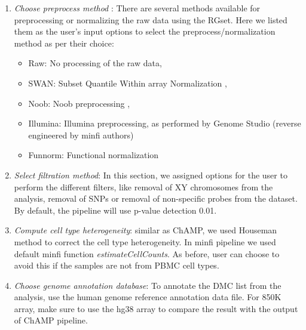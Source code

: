 \documentclass[
  a4paper,
  oneside,
  open=any]{scrreport}
\providecommand{\tightlist}{%
  \setlength{\itemsep}{0pt}\setlength{\parskip}{0pt}}\usepackage{longtable,booktabs,array}
\begin{document}
\begin{enumerate}
\def\labelenumi{\arabic{enumi}.}
\item
  \emph{Choose preprocess method} : There are several methods available
  for preprocessing or normalizing the raw data using the RGset. Here we
  listed them as the user's input options to select the
  preprocess/normalization method as per their choice:

  \begin{itemize}
  \tightlist
  \item
    Raw: No processing of the raw data,
  \item
    SWAN: Subset Quantile Within array Normalization
    \autocite{maksimovic2012swan,touleimat2012complete},
  \item
    Noob: Noob preprocessing \autocite{triche2013low},
  \item
    Illumina: Illumina preprocessing, as performed by Genome Studio
    (reverse engineered by minfi authors) \autocite{aryee2014minfi}
  \item
    Funnorm: Functional normalization \autocite{fortin2014functional}
  \end{itemize}
\item
  \emph{Select filtration method}: In this section, we assigned options
  for the user to perform the different filters, like removal of XY
  chromosomes from the analysis, removal of SNPs or removal of
  non-specific probes from the dataset. By default, the pipeline will
  use p-value detection 0.01.
\item
  \emph{Compute cell type heterogeneity}: similar as ChAMP, we used
  Houseman method to correct the cell type heterogeneity. In minfi
  pipeline we used default minfi function \emph{estimateCellCounts}. As
  before, user can choose to avoid this if the samples are not from PBMC
  cell types.
\item
  \emph{Choose genome annotation database}: To annotate the DMC list
  from the analysis, use the human genome reference annotation data
  file. For 850K array, make sure to use the hg38 array to compare the
  result with the output of ChAMP pipeline.\\
\end{enumerate}
\end{document}
